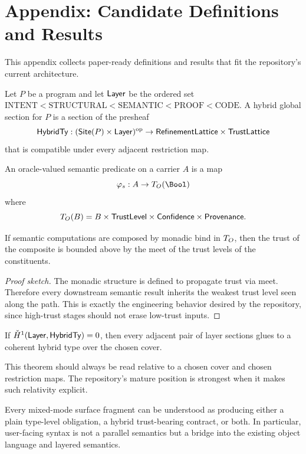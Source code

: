 \chapter{Appendix: Candidate Definitions and Results}

This appendix collects paper-ready definitions and results that fit the repository's
current architecture.

\begin{definition}
Let $P$ be a program and let $\mathsf{Layer}$ be the ordered set
$\mathrm{INTENT} < \mathrm{STRUCTURAL} < \mathrm{SEMANTIC} < \mathrm{PROOF} < \mathrm{CODE}$.
A hybrid global section for $P$ is a section of the presheaf
\[
  \mathsf{HybridTy} : (\mathsf{Site}(P) \times \mathsf{Layer})^{\mathrm{op}} \to \mathsf{RefinementLattice} \times \mathsf{TrustLattice}
\]
that is compatible under every adjacent restriction map.
\end{definition}

\begin{definition}
An oracle-valued semantic predicate on a carrier $A$ is a map
\[
  \varphi_s : A \to \TO(\Bool)
\]
where
\[
  T_O(B) = B \times \mathsf{TrustLevel} \times \mathsf{Confidence} \times \mathsf{Provenance}.
\]
\end{definition}

\begin{theorem}
If semantic computations are composed by monadic bind in $T_O$, then the trust of the
composite is bounded above by the meet of the trust levels of the constituents.
\end{theorem}

\begin{proof}[Proof sketch]
The monadic structure is defined to propagate trust via meet. Therefore every downstream
semantic result inherits the weakest trust level seen along the path. This is exactly the
engineering behavior desired by the repository, since high-trust stages should not erase
low-trust inputs.
\end{proof}

\begin{theorem}
If $\check{H}^{1}(\mathsf{Layer}, \mathsf{HybridTy}) = 0$, then every adjacent pair of layer sections glues to a
coherent hybrid type over the chosen cover.
\end{theorem}

\begin{remark}
This theorem should always be read relative to a chosen cover and chosen restriction maps.
The repository's mature position is strongest when it makes such relativity explicit.
\end{remark}

\begin{proposition}
Every mixed-mode surface fragment can be understood as producing either a plain type-level
obligation, a hybrid trust-bearing contract, or both. In particular, user-facing syntax is
not a parallel semantics but a bridge into the existing object language and layered
semantics.
\end{proposition}
